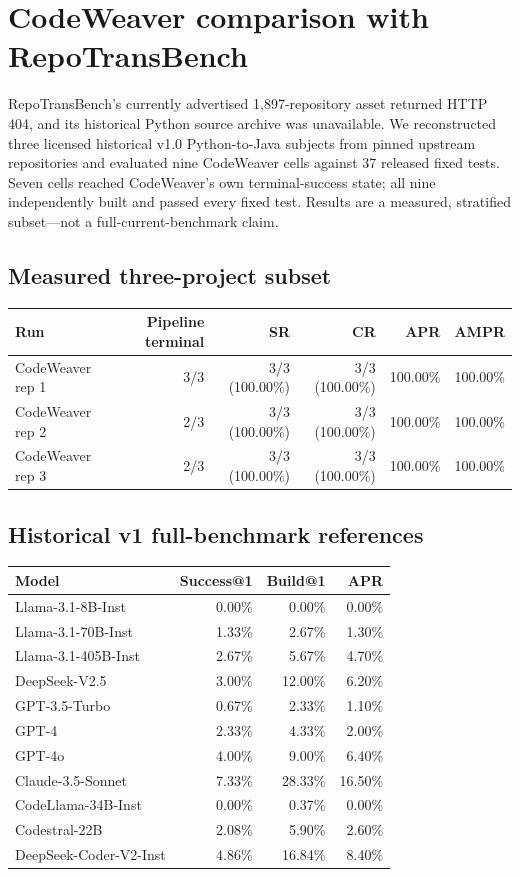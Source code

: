 \documentclass{article}
\begin{document}
\section*{CodeWeaver comparison with RepoTransBench}

RepoTransBench's currently advertised 1,897-repository asset returned HTTP 404, and its historical Python source archive was unavailable. We reconstructed three licensed historical v1.0 Python-to-Java subjects from pinned upstream repositories and evaluated nine CodeWeaver cells against 37 released fixed tests. Seven cells reached CodeWeaver's own terminal-success state; all nine independently built and passed every fixed test. Results are a measured, stratified subset—not a full-current-benchmark claim.

\subsection*{Measured three-project subset}

\begin{tabular}{lrrrrr}
\toprule
Run & Pipeline terminal & SR & CR & APR & AMPR \\
\midrule
CodeWeaver rep 1 & 3/3 & 3/3 (100.00\%) & 3/3 (100.00\%) & 100.00\% & 100.00\% \\
CodeWeaver rep 2 & 2/3 & 3/3 (100.00\%) & 3/3 (100.00\%) & 100.00\% & 100.00\% \\
CodeWeaver rep 3 & 2/3 & 3/3 (100.00\%) & 3/3 (100.00\%) & 100.00\% & 100.00\% \\
\bottomrule
\end{tabular}

\subsection*{Historical v1 full-benchmark references}

\begin{tabular}{lrrr}
\toprule
Model & Success@1 & Build@1 & APR \\
\midrule
Llama-3.1-8B-Inst & 0.00\% & 0.00\% & 0.00\% \\
Llama-3.1-70B-Inst & 1.33\% & 2.67\% & 1.30\% \\
Llama-3.1-405B-Inst & 2.67\% & 5.67\% & 4.70\% \\
DeepSeek-V2.5 & 3.00\% & 12.00\% & 6.20\% \\
GPT-3.5-Turbo & 0.67\% & 2.33\% & 1.10\% \\
GPT-4 & 2.33\% & 4.33\% & 2.00\% \\
GPT-4o & 4.00\% & 9.00\% & 6.40\% \\
Claude-3.5-Sonnet & 7.33\% & 28.33\% & 16.50\% \\
CodeLlama-34B-Inst & 0.00\% & 0.37\% & 0.00\% \\
Codestral-22B & 2.08\% & 5.90\% & 2.60\% \\
DeepSeek-Coder-V2-Inst & 4.86\% & 16.84\% & 8.40\% \\
\bottomrule
\end{tabular}
\end{document}

